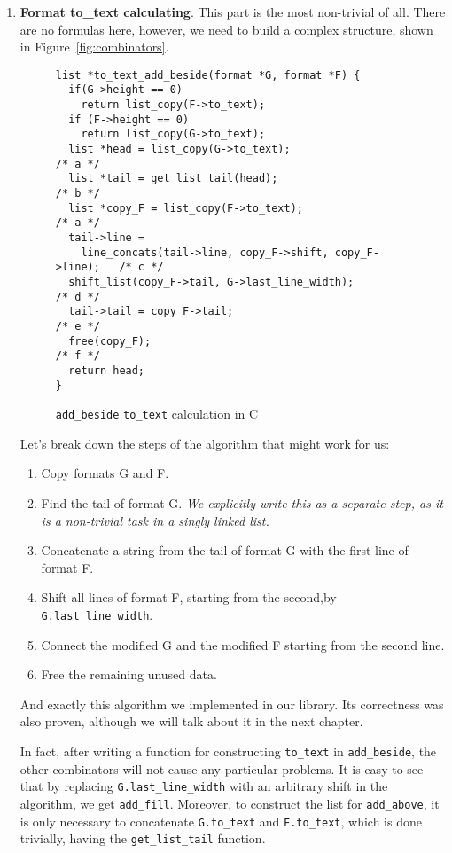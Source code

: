 \documentclass[14pt]{constructor-diploma}
\begin{document}
\begin{enumerate}
  \item \textbf{Format to\_text calculating}. This part is the most non-trivial of all. 
  There are no formulas here, however, we need to build a complex structure, shown in Figure~\ref{fig:combinators}. 

\begin{figure}[H]
\begin{mdframed}[backgroundcolor=bg]
\begin{verbatim}
list *to_text_add_beside(format *G, format *F) {
  if(G->height == 0)
    return list_copy(F->to_text);
  if (F->height == 0)
    return list_copy(G->to_text);
  list *head = list_copy(G->to_text);                        /* a */
  list *tail = get_list_tail(head);                          /* b */
  list *copy_F = list_copy(F->to_text);                      /* a */
  tail->line = 
    line_concats(tail->line, copy_F->shift, copy_F->line);   /* c */
  shift_list(copy_F->tail, G->last_line_width);              /* d */
  tail->tail = copy_F->tail;                                 /* e */
  free(copy_F);                                              /* f */
  return head;
}
\end{verbatim}
\end{mdframed}
\caption{\texttt{add\_beside} \texttt{to\_text} calculation in C}
\label{fig:to_text_calculation}
\end{figure}

  Let's break down the steps of the algorithm that might work for us:
  \begin{enumerate}
    \item Copy formats G and F.
    \item Find the tail of format G. \textit{We explicitly write this as a separate step, as it is a non-trivial task in a singly linked list.}
    \item Concatenate a string from the tail of format G with the first line of format F.
    \item Shift all lines of format F, starting from the second,\newline by \texttt{G.last\_line\_width}.
    \item Connect the modified G and the modified F starting from the second line.
    \item Free the remaining unused data.
  \end{enumerate}
  And exactly this algorithm we implemented in our library. Its correctness was also proven, although we will talk about it in the next chapter.

  In fact, after writing a function for constructing \texttt{to\_text} in \texttt{add\_beside}, the other combinators will not cause any particular problems. 
  It is easy to see that by replacing \texttt{G.last\_line\_width} with an arbitrary shift in the algorithm, we get \texttt{add\_fill}. 
  Moreover, to construct the list for \texttt{add\_above}, it is only necessary to concatenate \texttt{G.to\_text} and \texttt{F.to\_text}, which is done trivially, having the \texttt{get\_list\_tail} function.
\end{enumerate}
\end{document}
